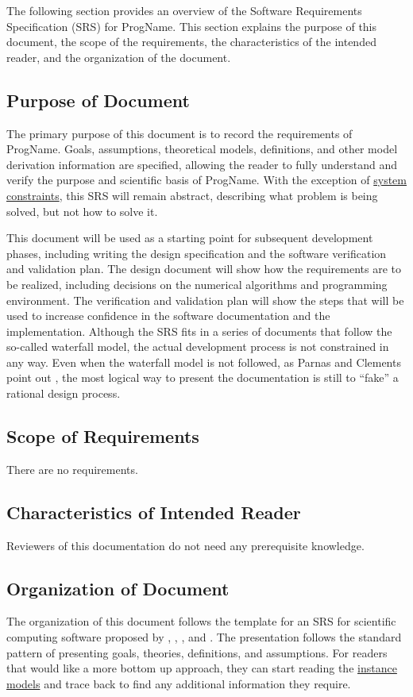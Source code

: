 \documentclass[12pt]{article}
\begin{document}
The following section provides an overview of the Software Requirements Specification (SRS) for ProgName. This section explains the purpose of this document, the scope of the requirements, the characteristics of the intended reader, and the organization of the document.

\subsection{Purpose of Document}
\label{Sec:DocPurpose}
The primary purpose of this document is to record the requirements of ProgName. Goals, assumptions, theoretical models, definitions, and other model derivation information are specified, allowing the reader to fully understand and verify the purpose and scientific basis of ProgName. With the exception of \hyperref[Sec:SysConstraints]{system constraints}, this SRS will remain abstract, describing what problem is being solved, but not how to solve it.

This document will be used as a starting point for subsequent development phases, including writing the design specification and the software verification and validation plan. The design document will show how the requirements are to be realized, including decisions on the numerical algorithms and programming environment. The verification and validation plan will show the steps that will be used to increase confidence in the software documentation and the implementation. Although the SRS fits in a series of documents that follow the so-called waterfall model, the actual development process is not constrained in any way. Even when the waterfall model is not followed, as Parnas and Clements point out \cite{parnasClements1986}, the most logical way to present the documentation is still to ``fake'' a rational design process.

\subsection{Scope of Requirements}
\label{Sec:ReqsScope}
There are no requirements.

\subsection{Characteristics of Intended Reader}
\label{Sec:ReaderChars}
Reviewers of this documentation do not need any prerequisite knowledge.

\subsection{Organization of Document}
\label{Sec:DocOrg}
The organization of this document follows the template for an SRS for scientific computing software proposed by \cite{koothoor2013}, \cite{smithLai2005}, \cite{smithEtAl2007}, and \cite{smithKoothoor2016}. The presentation follows the standard pattern of presenting goals, theories, definitions, and assumptions. For readers that would like a more bottom up approach, they can start reading the \hyperref[Sec:IMs]{instance models} and trace back to find any additional information they require.
\end{document}
